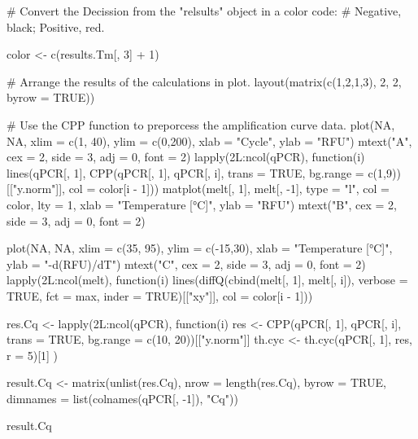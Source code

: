 \begin{example}
# Convert the Decission from the "relsults" object in a color code:
# Negative, black; Positive, red.

color <- c(results.Tm[, 3] + 1)

# Arrange the results of the calculations in plot.
layout(matrix(c(1,2,1,3), 2, 2, byrow = TRUE))

# Use the CPP function to preporcess the amplification curve data.
plot(NA, NA, xlim = c(1, 40), ylim = c(0,200), xlab = "Cycle", ylab = "RFU")
mtext("A", cex = 2, side = 3, adj = 0, font = 2)
lapply(2L:ncol(qPCR), function(i) 
  lines(qPCR[, 1], 
        CPP(qPCR[, 1], qPCR[, i], trans = TRUE, 
            bg.range = c(1,9))[["y.norm"]],
        col = color[i - 1]))
matplot(melt[, 1], melt[, -1], type = "l", col = color, 
	lty = 1, xlab = "Temperature [°C]", ylab = "RFU")
mtext("B", cex = 2, side = 3, adj = 0, font = 2)
	
plot(NA, NA, xlim = c(35, 95), ylim = c(-15,30), xlab = "Temperature [°C]", 
     ylab = "-d(RFU)/dT")
mtext("C", cex = 2, side = 3, adj = 0, font = 2)
lapply(2L:ncol(melt), function(i)
  lines(diffQ(cbind(melt[, 1], melt[, i]), verbose = TRUE, 
              fct = max, inder = TRUE)[["xy"]], col = color[i - 1]))

res.Cq <- lapply(2L:ncol(qPCR), function(i) {
	      res <- CPP(qPCR[, 1], qPCR[, i], trans = TRUE, bg.range = c(10, 20))[["y.norm"]]
	      th.cyc <- th.cyc(qPCR[, 1], res, r = 5)[1]
	      })
	      
result.Cq <- matrix(unlist(res.Cq), nrow = length(res.Cq), byrow = TRUE, 
       dimnames = list(colnames(qPCR[, -1]),
       "Cq"))
       
result.Cq
\end{example}


